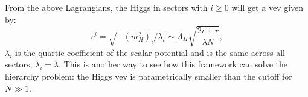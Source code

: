 \documentclass[nofootinbib,twocolumn,preprintnumbers]{revtex4-1}
\begin{document}
From the above Lagrangians, the Higgs in sectors with $i \geq 0$ will get a vev given by:
\begin{equation}\label{eqn:vevs}
v^i = \sqrt{-(m_H^2)_i/\lambda_i} \sim \Lambda_H\sqrt{\frac{2i + r}{\lambda N}},
\end{equation}
$\lambda_i$ is the quartic coefficient of the scalar potential and is the same across all sectors, $\lambda_i=\lambda$. This is another way to see how this framework can solve the hierarchy problem: the Higgs vev is parametrically smaller than the cutoff for $N \gg 1$. 
%
%
%
%
%
%
\end{document}
